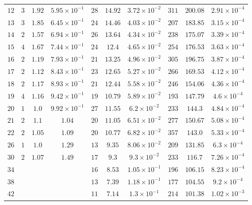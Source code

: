 \begin{center}
\begin{table}
\begin{center}
\begin{tabular}{ c||ccc|ccc|ccc }
$12$ & $3$ & $1.92$ & $5.95\times 10^{-1}$   & $28$ & $14.92$ & $3.72\times 10^{-2}$   & $311$ & $200.08$ & $2.91\times 10^{-4}$  \\ 
$13$ & $3$ & $1.85$ & $6.45\times 10^{-1}$   & $24$ & $14.46$ & $4.03\times 10^{-2}$   & $207$ & $183.85$ & $3.15\times 10^{-4}$  \\ 
$14$ & $2$ & $1.57$ & $6.94\times 10^{-1}$   & $26$ & $13.64$ & $4.34\times 10^{-2}$   & $238$ & $175.07$ & $3.39\times 10^{-4}$  \\ 
$15$ & $4$ & $1.67$ & $7.44\times 10^{-1}$   & $24$ & $12.4$ & $4.65\times 10^{-2}$    & $254$ & $176.53$ & $3.63\times 10^{-4}$  \\ 
$16$ & $2$ & $1.19$ & $7.93\times 10^{-1}$   & $21$ & $13.25$ & $4.96\times 10^{-2}$   & $305$ & $196.75$ & $3.87\times 10^{-4}$  \\ 
$17$ & $2$ & $1.12$ & $8.43\times 10^{-1}$   & $23$ & $12.65$ & $5.27\times 10^{-2}$   & $266$ & $169.53$ & $4.12\times 10^{-4}$  \\ 
$18$ & $2$ & $1.17$ & $8.93\times 10^{-1}$   & $21$ & $12.44$ & $5.58\times 10^{-2}$   & $246$ & $154.06$ & $4.36\times 10^{-4}$  \\ 
$19$ & $4$ & $1.16$ & $9.42\times 10^{-1}$   & $19$ & $10.79$ & $5.89\times 10^{-2}$   & $193$ & $147.79$ & $4.6\times 10^{-4}$   \\ 
$20$ & $1$ & $1.0$  & $9.92\times 10^{-1}$   & $27$ & $11.55$ & $6.2\times 10^{-2}$    & $233$ & $144.3$ & $4.84\times 10^{-4}$   \\ 
$21$ & $2$ & $1.1$  & $1.04$                 & $20$ & $11.05$ & $6.51\times 10^{-2}$   & $277$ & $150.67$ & $5.08\times 10^{-4}$  \\ 
$22$ & $2$ & $1.05$ & $1.09$                 & $20$ & $10.77$ & $6.82\times 10^{-2}$   & $357$ & $143.0$ & $5.33\times 10^{-4}$   \\ 
$26$ & $1$ & $1.0$  & $1.29$                 & $13$ & $9.35$ & $8.06\times 10^{-2}$    & $209$ & $131.85$ & $6.3\times 10^{-4}$   \\ 
$30$ & $2$ & $1.07$ & $1.49$                 & $17$ & $9.3$ & $9.3\times 10^{-2}$      & $233$ & $116.7$ & $7.26\times 10^{-4}$   \\ 
$34$  &&&& $16$ & $8.53$ & $1.05\times 10^{-1}$ & $196$ & $106.15$ & $8.23\times 10^{-4}$ \\ 
$38$  &&&& $13$ & $7.39$ & $1.18\times 10^{-1}$ & $177$ & $104.55$ & $9.2\times 10^{-4}$  \\ 
$42$  &&&& $11$ & $7.14$ & $1.3\times 10^{-1}$  & $214$ & $101.38$ & $1.02\times 10^{-3}$ \\ 

\end{tabular}
\end{center}
\end{table}
\end{center}
